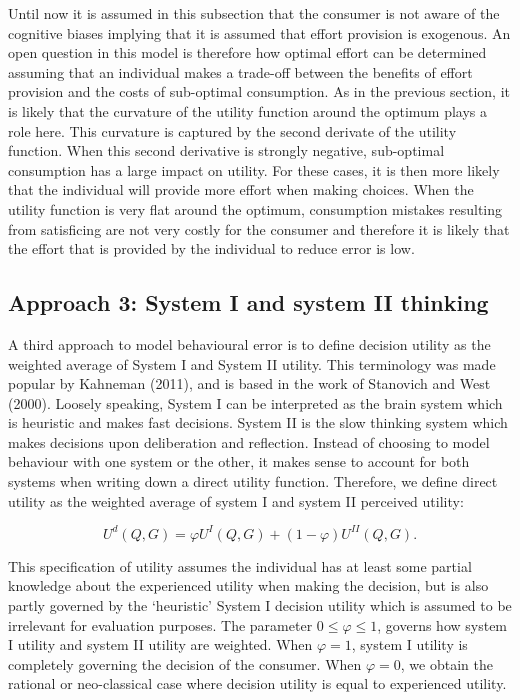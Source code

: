 \documentclass[
]{book}
\begin{document}
Until now it is assumed in this subsection that the consumer is not aware of the cognitive biases implying that it is assumed that effort provision is exogenous. An open question in this model is therefore how optimal effort can be determined assuming that an individual makes a trade-off between the benefits of effort provision and the costs of sub-optimal consumption. As in the previous section, it is likely that the curvature of the utility function around the optimum plays a role here. This curvature is captured by the second derivate of the utility function. When this second derivative is strongly negative, sub-optimal consumption has a large impact on utility. For these cases, it is then more likely that the individual will provide more effort when making choices. When the utility function is very flat around the optimum, consumption mistakes resulting from satisficing are not very costly for the consumer and therefore it is likely that the effort that is provided by the individual to reduce error is low.

\hypertarget{approach3}{%
\subsection{Approach 3: System I and system II thinking}\label{approach3}}

A third approach to model behavioural error is to define decision utility as the weighted average of System I and System II utility. This terminology was made popular by Kahneman (2011), and is based in the work of Stanovich and West (2000). Loosely speaking, System I can be interpreted as the brain system which is heuristic and makes fast decisions. System II is the slow thinking system which makes decisions upon deliberation and reflection. Instead of choosing to model behaviour with one system or the other, it makes sense to account for both systems when writing down a direct utility function. Therefore, we define direct utility as the weighted average of system I and system II perceived utility:

\begin{equation}
U^d (Q,G)= \varphi U^I (Q, G) + (1 - \varphi) U^{II} (Q, G). 
\end{equation}

This specification of utility assumes the individual has at least some partial knowledge about the experienced utility when making the decision, but is also partly governed by the `heuristic' System I decision utility which is assumed to be irrelevant for evaluation purposes. The parameter \(0 \leq \varphi \leq 1\), governs how system I utility and system II utility are weighted. When \(\varphi=1\), system I utility is completely governing the decision of the consumer. When \(\varphi=0\), we obtain the rational or neo-classical case where decision utility is equal to experienced utility.
\end{document}
